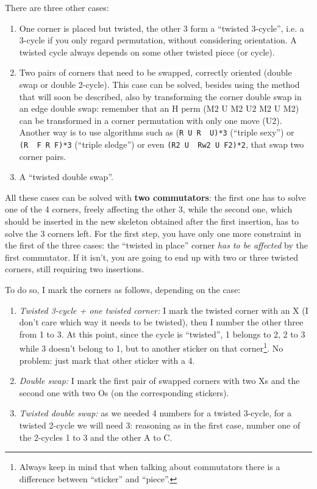 \documentclass[11pt,a4paper]{book}
\newcommand{\p}{\textquotesingle}
\newcommand{\m}{\texttt}
\newcommand{\ps}{\p\,\,}
\begin{document}
There are three other cases:
\begin{enumerate}
\item One corner is placed but twisted, the other 3 form a ``twisted 3-cycle'', i.e. a 3-cycle if you only regard permutation, without considering orientation. A twisted cycle always depends on some other twisted piece (or cycle).
\item Two pairs of corners that need to be swapped, correctly oriented (double swap or double 2-cycle). This case can be solved, besides using the method that will soon be described, also by transforming the corner double swap in an edge double swap: remember that an H perm (M2 U M2 U2 M2 U M2) can be transformed in a corner permutation with only one move (U2). Another way is to use algorithms such as (\m{R U R\ps U\p)*3} (``triple sexy'') or \m{(R\ps F R F\p)*3} (``triple sledge'') or even \m{(R2 U\ps Rw2 U F2)*2}, that swap two corner pairs.
\item A ``twisted double swap''.
\end{enumerate}

All these cases can be solved with \textbf{two commutators}: the first one has to solve one of the 4 corners, freely affecting the other 3, while the second one, which should be inserted in the new skeleton obtained after the first insertion, has to solve the 3 corners left. For the first step, you have only one more constraint in the first of the three cases: the ``twisted in place'' corner \emph{has to be affected} by the first commutator. If it isn't, you are going to end up with two or three twisted corners, still requiring two insertions.

To do so, I mark the corners as follows, depending on the case:
\begin{enumerate}
\item \emph{Twisted 3-cycle + one twisted corner:} I mark the twisted corner with an X (I don't care which way it needs to be twisted), then I number the other three from 1 to 3. At this point, since the cycle is ``twisted'', 1 belongs to 2, 2 to 3 while 3 doesn't belong to 1, but to another sticker on that corner\footnote{Always keep in mind that when talking about commutators there is a difference between ``sticker'' and ``piece''.}. No problem: just mark that other sticker with a 4.
\item \emph{Double swap:} I mark the first pair of swapped corners with two Xs and the second one with two Os (on the corresponding stickers).
\item \emph{Twisted double swap:} as we needed 4 numbers for a twisted 3-cycle, for a twisted 2-cycle we will need 3: reasoning as in the first case, number one of the 2-cycles 1 to 3 and the other A to C.
\end{enumerate}
\end{document}
